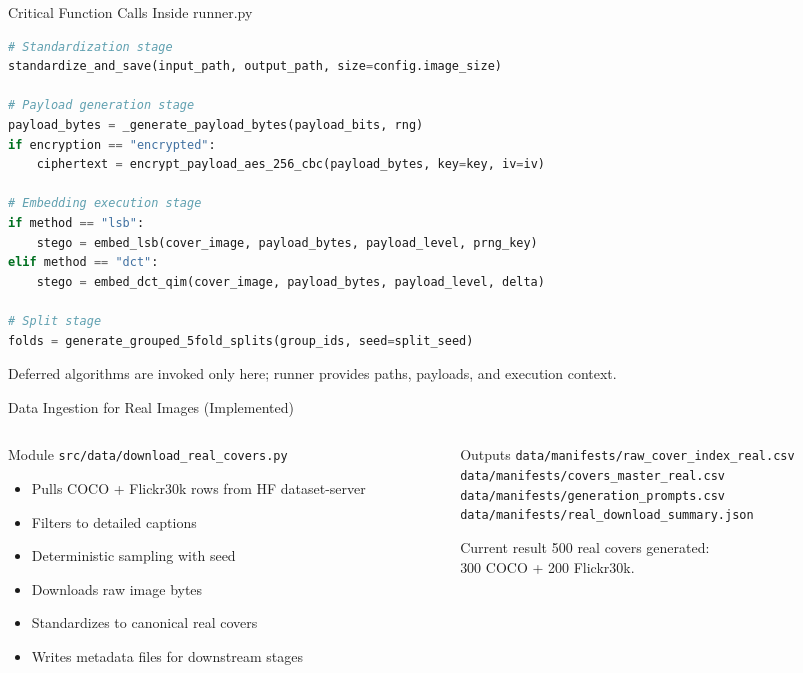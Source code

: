 \documentclass[aspectratio=169,11pt]{beamer}
\begin{document}
\begin{frame}[fragile]{Critical Function Calls Inside runner.py}
\tiny
\begin{lstlisting}[language=Python]
# Standardization stage
standardize_and_save(input_path, output_path, size=config.image_size)

# Payload generation stage
payload_bytes = _generate_payload_bytes(payload_bits, rng)
if encryption == "encrypted":
    ciphertext = encrypt_payload_aes_256_cbc(payload_bytes, key=key, iv=iv)

# Embedding execution stage
if method == "lsb":
    stego = embed_lsb(cover_image, payload_bytes, payload_level, prng_key)
elif method == "dct":
    stego = embed_dct_qim(cover_image, payload_bytes, payload_level, delta)

# Split stage
folds = generate_grouped_5fold_splits(group_ids, seed=split_seed)
\end{lstlisting}
{\scriptsize Deferred algorithms are invoked only here; runner provides paths, payloads, and execution context.}
\end{frame}

\begin{frame}{Data Ingestion for Real Images (Implemented)}
\small
\begin{columns}[T]
\begin{column}{0.5\textwidth}
\begin{block}{Module}
\texttt{src/data/download\_real\_covers.py}
\end{block}
\begin{itemize}
\item Pulls COCO + Flickr30k rows from HF dataset-server
\item Filters to detailed captions
\item Deterministic sampling with seed
\item Downloads raw image bytes
\item Standardizes to canonical real covers
\item Writes metadata files for downstream stages
\end{itemize}
\end{column}
\begin{column}{0.46\textwidth}
\begin{alertblock}{Outputs}
\scriptsize
\texttt{data/manifests/raw\_cover\_index\_real.csv}\\
\texttt{data/manifests/covers\_master\_real.csv}\\
\texttt{data/manifests/generation\_prompts.csv}\\
\texttt{data/manifests/real\_download\_summary.json}
\end{alertblock}
\begin{exampleblock}{Current result}
\small
500 real covers generated:\\
300 COCO + 200 Flickr30k.
\end{exampleblock}
\end{column}
\end{columns}
\end{frame}
\end{document}
